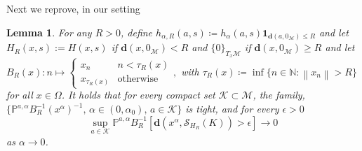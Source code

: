\documentclass{article}
\newtheorem{lemma}{Lemma}
\newcommand{\CM}{\mathcal{M}}
\newcommand{\CK}{\mathcal{K}}
\newcommand{\BN}{\mathbb{N}}
\newcommand{\bd}{\mathbf{d}}
\newcommand{\norm}[1]{\left\lVert#1\right\rVert}
\begin{document}
Next we reprove, in our setting~\cite[Lemma 6.3]{bianchi2019constant}
\begin{lemma}
For any $R>0$, define $h_{\alpha,R}(a,s)\coloneqq h_\alpha(a,s)\mathbf{1}_{\bd(a,0_{\CM})\leq R}$ and let $H_{R}(x,s):=H(x,s)$ if $\bd(x,0_{\CM})<R$ and $\{0\}_{T_x\mathcal{M}}$ if $\bd(x,0_{\CM})\ge R$ and let $B_R(x):n\mapsto \begin{cases} x_n & n< \tau_R(x)\\ x_{\tau_R(x)} & \text{otherwise} \end{cases},$ with $\tau_R(x)\coloneqq \inf\{n\in\BN : \norm{x_n}>R\}$ for all $x\in\Omega$. It holds that
    for every compact set $\CK\subset \mathcal{M}$, the family, $\{\mathbb{P}^{a,\alpha}B^{-1}_R(x^{\alpha})^{-1},\,\alpha\in(0,\alpha_0),\, a\in \CK\}$ is tight, and for every $\epsilon>0$
    \[
\sup\limits_{a\in \CK} \mathbb{P}^{a,\alpha} B^{-1}_R [\bd(x^{\alpha},\mathcal{S}_{H_R}(K))>\epsilon] \to 0
    \]
    as $\alpha\to 0$.
\end{lemma}
\end{document}
